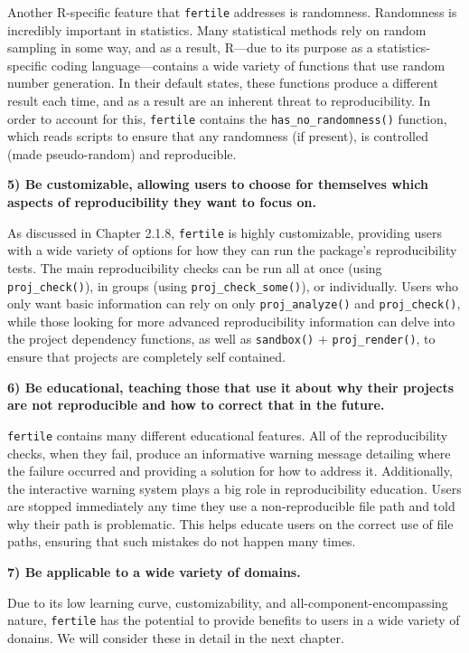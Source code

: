 \documentclass[12pt,twoside]{reedthesis}
\begin{document}
Another R-specific feature that \texttt{fertile} addresses is randomness. Randomness is incredibly important in statistics. Many statistical methods rely on random sampling in some way, and as a result, R---due to its purpose as a statistics-specific coding language---contains a wide variety of functions that use random number generation. In their default states, these functions produce a different result each time, and as a result are an inherent threat to reproducibility. In order to account for this, \texttt{fertile} contains the \texttt{has\_no\_randomness()} function, which reads scripts to ensure that any randomness (if present), is controlled (made pseudo-random) and reproducible.

\textbf{5) Be customizable, allowing users to choose for themselves which aspects of reproducibility they want to focus on.}

As discussed in Chapter 2.1.8, \texttt{fertile} is highly customizable, providing users with a wide variety of options for how they can run the package's reproducibility tests. The main reproducibility checks can be run all at once (using \texttt{proj\_check()}), in groups (using \texttt{proj\_check\_some()}), or individually. Users who only want basic information can rely on only \texttt{proj\_analyze()} and \texttt{proj\_check()}, while those looking for more advanced reproducibility information can delve into the project dependency functions, as well as \texttt{sandbox()} + \texttt{proj\_render()}, to ensure that projects are completely self contained.

\textbf{6) Be educational, teaching those that use it about why their projects are not reproducible and how to correct that in the future.}

\texttt{fertile} contains many different educational features. All of the reproducibility checks, when they fail, produce an informative warning message detailing where the failure occurred and providing a solution for how to address it. Additionally, the interactive warning system plays a big role in reproducibility education. Users are stopped immediately any time they use a non-reproducible file path and told why their path is problematic. This helps educate users on the correct use of file paths, ensuring that such mistakes do not happen many times.

\textbf{7) Be applicable to a wide variety of domains.}

Due to its low learning curve, customizability, and all-component-encompassing nature, \texttt{fertile} has the potential to provide benefits to users in a wide variety of donains. We will consider these in detail in the next chapter.
\end{document}
